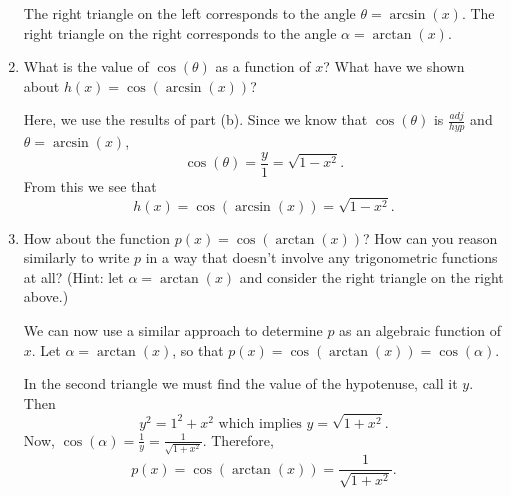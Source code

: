 \documentclass{ximera}
\begin{document}
\begin{example}
\begin{enumerate}
The right triangle on the left corresponds to the angle $\theta = \arcsin(x)$.
%
The right triangle on the right corresponds to the angle $\alpha = \arctan(x)$.
%
\item What is the value of $\cos(\theta)$ as a function of $x$?  What have we shown about $h(x) = \cos(\arcsin(x))$?\\
%
\begin{explanation}
Here, we use the results of part (b). Since we know that $\cos(\theta)$ is $\frac{adj}{hyp}$ and $\theta = \arcsin(x)$,
%
$$\cos(\theta) = \frac{y}{1} = \sqrt{1-x^2}.$$
From this we see that
%
$$h(x) = \cos(\arcsin(x)) = \sqrt{1-x^2}.$$
\end{explanation}

%
\item How about the function $p(x) = \cos(\arctan(x))$?  How can you reason similarly to write $p$ in a way that doesn't involve any trigonometric functions at all?  (Hint:  let $\alpha = \arctan(x)$ and consider the right triangle on the right above.)\\
%
\begin{explanation}
We can now use a similar approach to determine $p$ as an algebraic function of $x$. Let $\alpha = \arctan(x)$, so that $p(x)= \cos(\arctan(x)) = \cos(\alpha)$.

In the second triangle we must find the value of the hypotenuse, call it $y$. Then
$$y^2 = 1^2 + x^2 \text{ which implies } y = \sqrt{1+x^2}.$$
%
Now, $\cos(\alpha) = \frac{1}{y} = \frac{1}{\sqrt{1+x^2}}$. Therefore, 
%
$$p(x) = \cos(\arctan(x)) = \frac{1}{\sqrt{1+x^2}}.$$
\end{explanation}
%
\end{enumerate}

\end{example}
\end{document}
